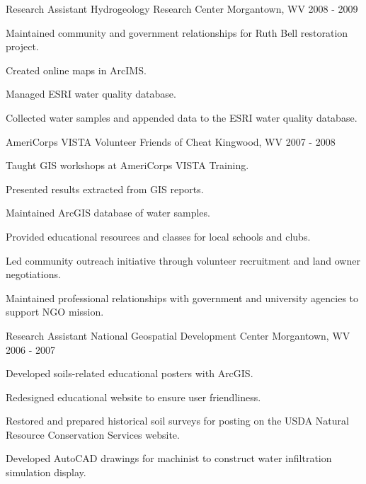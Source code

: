 \begin{cventries}

\cventry
{Research Assistant} %
{Hydrogeology Research Center} %
{Morgantown, WV} %
{2008 - 2009} %
{ %
\begin{cvitems}
\item {Maintained community and government relationships for Ruth Bell restoration project.}
\item {Created online maps in ArcIMS.}
\item {Managed ESRI water quality database.}
\item {Collected water samples and appended data to the ESRI water quality database.}
\end{cvitems}
}


\cventry
{AmeriCorps VISTA Volunteer} %
{Friends of Cheat} %
{Kingwood, WV} %
{2007 - 2008} %
{ %
\begin{cvitems}
\item {Taught GIS workshops at AmeriCorps VISTA Training.}
\item {Presented results extracted from GIS reports.}
\item {Maintained ArcGIS database of water samples.}
\item {Provided educational resources and classes for local schools and clubs.}
\item {Led community outreach initiative through volunteer recruitment and land owner negotiations.}
\item {Maintained professional relationships with government and university agencies to support NGO mission.}
\end{cvitems}
}


\cventry
{Research Assistant} %
{National Geospatial Development Center} %
{Morgantown, WV} %
{2006 - 2007} %
{ %
\begin{cvitems}
\item {Developed soils-related educational posters with ArcGIS.}
\item {Redesigned educational website to ensure user friendliness.}
\item {Restored and prepared historical soil surveys for posting on the USDA Natural Resource Conservation Services website.}
\item {Developed AutoCAD drawings for machinist to construct water infiltration simulation display.}
\end{cvitems}
}

\vspace{-3mm}
\end{cventries}